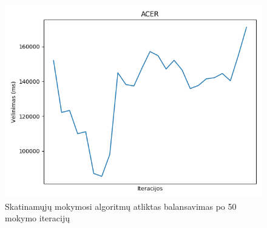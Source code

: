 \documentclass{VUMIFPSbakalaurinis}
\begin{document}
\begin{figure}[H]
\begin{minipage}[b]{0.4\textwidth}
    \end{minipage}
    \hspace{1mm}
    \begin{minipage}[b]{0.4\textwidth}
        \includegraphics[width=\textwidth]{img/acer_50.png}
    \end{minipage}
    \caption{Skatinamųjų mokymosi algoritmų atliktas balansavimas po 50 mokymo iteracijų}
\end{figure}
\end{document}
